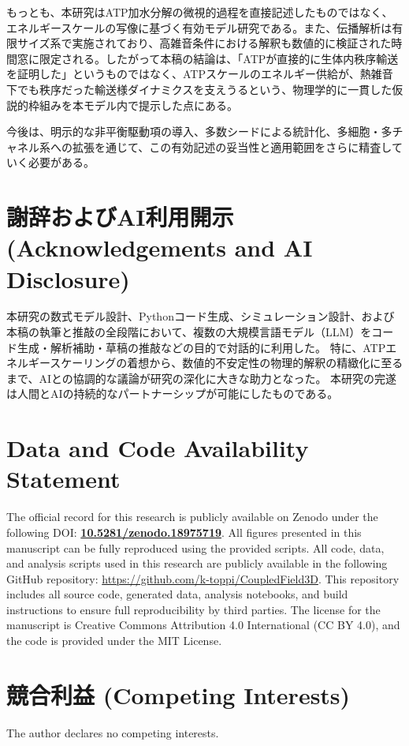 \documentclass[a4paper,11pt,ja=standard,lualatex]{bxjsarticle}
\begin{document}
もっとも、本研究はATP加水分解の微視的過程を直接記述したものではなく、エネルギースケールの写像に基づく有効モデル研究である。また、伝播解析は有限サイズ系で実施されており、高雑音条件における解釈も数値的に検証された時間窓に限定される。したがって本稿の結論は、「ATPが直接的に生体内秩序輸送を証明した」というものではなく、ATPスケールのエネルギー供給が、熱雑音下でも秩序だった輸送様ダイナミクスを支えうるという、物理学的に一貫した仮説的枠組みを本モデル内で提示した点にある。

今後は、明示的な非平衡駆動項の導入、多数シードによる統計化、多細胞・多チャネル系への拡張を通じて、この有効記述の妥当性と適用範囲をさらに精査していく必要がある。

\FloatBarrier

\section*{謝辞およびAI利用開示 (Acknowledgements and AI Disclosure)}
本研究の数式モデル設計、Pythonコード生成、シミュレーション設計、および本稿の執筆と推敲の全段階において、複数の大規模言語モデル（LLM）をコード生成・解析補助・草稿の推敲などの目的で対話的に利用した。
特に、ATPエネルギースケーリングの着想から、数値的不安定性の物理的解釈の精緻化に至るまで、AIとの協調的な議論が研究の深化に大きな助力となった。
本研究の完遂は人間とAIの持続的なパートナーシップが可能にしたものである。

\section*{Data and Code Availability Statement}
The official record for this research is publicly available on Zenodo under the following DOI: \href{https://doi.org/10.5281/zenodo.18975719}{\textbf{10.5281/zenodo.18975719}}.
All figures presented in this manuscript can be fully reproduced using the provided scripts.
All code, data, and analysis scripts used in this research are publicly available in the following GitHub repository: \url{https://github.com/k-toppi/CoupledField3D}.
This repository includes all source code, generated data, analysis notebooks, and build instructions to ensure full reproducibility by third parties.
The license for the manuscript is Creative Commons Attribution 4.0 International (CC BY 4.0), and the code is provided under the MIT License.

\section*{競合利益 (Competing Interests)}
The author declares no competing interests.

\FloatBarrier




\end{document}
